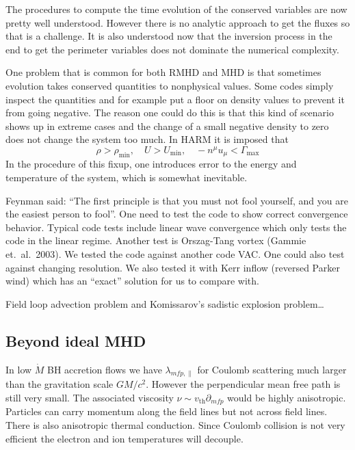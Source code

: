 \documentclass[letterpaper, 11pt]{article}
\numberwithin{equation}{section}
\numberwithin{figure}{section}
\begin{document}
The procedures to compute the time evolution of the conserved variables are now
pretty well understood. However there is no analytic approach to get the
fluxes so that is a challenge. It is also understood now that the inversion
process in the end to get the perimeter variables does not dominate the
numerical complexity.

One problem that is common for both RMHD and MHD is that sometimes evolution
takes conserved quantities to nonphysical values. Some codes simply inspect the
quantities and for example put a floor on density values to prevent it from
going negative. The reason one could do this is that this kind of scenario shows
up in extreme cases and the change of a small negative density to zero does not
change the system too much. In HARM it is imposed that
\begin{equation}
  \label{eq:37}
  \rho > \rho_\mathrm{min},\quad U > U_\mathrm{min},\quad -n^{\mu}u_{\mu} < \Gamma_\mathrm{max}
\end{equation}
In the procedure of this fixup, one introduces error to the energy and
temperature of the system, which is somewhat inevitable.

Feynman said: ``The first principle is that you must not fool yourself, and you
are the easiest person to fool''. One need to test the code to show correct
convergence behavior. Typical code tests include linear wave convergence which
only tests the code in the linear regime. Another test is Orszag-Tang vortex
(Gammie et.\ al.\ 2003). We tested the code against another code VAC. One could
also test against changing resolution. We also tested it with Kerr inflow
(reversed Parker wind) which has an ``exact'' solution for us to compare with.

Field loop advection problem and Komissarov's sadistic explosion problem\dots

\subsection{Beyond ideal MHD}

In low $\dot{M}$ BH accretion flows we have $\lambda_{mfp,\parallel}$ for
Coulomb scattering much larger than the gravitation scale $GM/c^2$. However the
perpendicular mean free path is still very small. The associated viscosity $\nu
\sim v_\mathrm{th}\partial_{mfp}$ would be highly anisotropic. Particles can
carry momentum along the field lines but not across field lines. There is also
anisotropic thermal conduction. Since Coulomb collision is not very efficient
the electron and ion temperatures will decouple.
\end{document}
